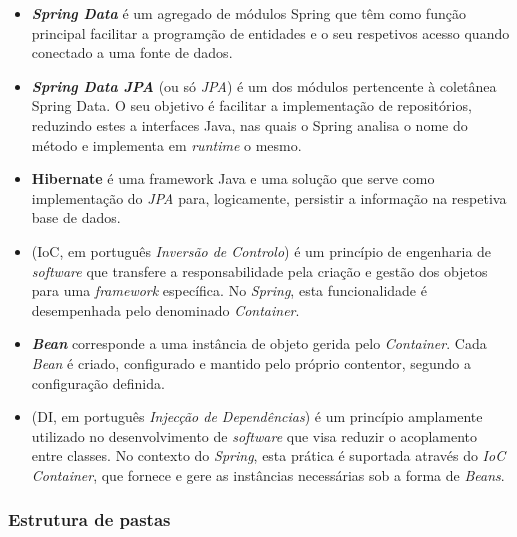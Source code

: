\begin{itemize}
    \item \textbf{\textit{Spring Data}} é um agregado de módulos Spring que têm como função principal facilitar a programção de entidades e o seu respetivos acesso quando conectado a uma fonte de dados.

    \item \textbf{\textit{Spring Data JPA}} (ou só \textit{JPA}) é um dos módulos pertencente à coletânea Spring Data. O seu objetivo é facilitar a implementação de repositórios, reduzindo estes a interfaces Java, nas quais o Spring analisa o nome do método e implementa em \textit{runtime} o mesmo. 

    \item \textbf{\gls{Hibernate}} \cite{docs-hibernate} é uma framework Java e uma solução  que serve como implementação do \textit{JPA} para, logicamente, persistir a informação na respetiva base de dados.

    \item \textbf{} (\acrlong{IoC}, em português \textit{Inversão de Controlo}) é um princípio de engenharia de \textit{software} que transfere a responsabilidade pela criação e gestão dos objetos para uma \textit{framework} específica. No \textit{Spring}, esta funcionalidade é desempenhada pelo denominado \textit{ Container}.
    
    \item \textbf{\textit{Bean}} corresponde a uma instância de objeto gerida pelo \textit{ Container}. Cada \textit{Bean} é criado, configurado e mantido pelo próprio contentor, segundo a configuração definida.
    
    \item \textbf{} (\acrlong{DI}, em português \textit{Injecção de Dependências}) é um princípio amplamente utilizado no desenvolvimento de \textit{software} que visa reduzir o acoplamento entre classes. No contexto do \textit{Spring}, esta prática é suportada através do \textit{IoC Container}, que fornece e gere as instâncias necessárias sob a forma de \textit{Beans}.
    
\end{itemize}









\subsubsection{Estrutura de pastas}

